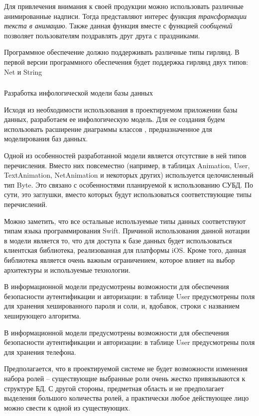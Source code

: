 Для привлечения внимания к своей продукции можно использовать различные анимированные надписи. Тогда представляют интерес функция \emph{трансформации текста в анимацию}. Также данная функция вместе с функцией \emph{сообщений} позволяет пользователям поздравлять друг друга с праздниками.

Программное обеспечение должно поддерживать различные типы гирлянд. В первой версии программного обеспечения будет поддержка гирлянд двух типов: Net и String

\subsubsection{ } Разработка инфологической модели базы данных 
\label{sec:domain:model:db}

Исходя из необходимости использования в проектируемом приложении базы данных, разработаем ее инфологическую модель. Для ее создания будем использовать расширение диаграммы классов \uml, предназначенное для моделирования баз данных.

Одной из особенностей разработанной модели является отсутствие в ней типов перечисления. Вместо них повсеместно (например, в таблицах Animation, User, TextAnimation, NetAnimation и некоторых других) используется целочисленный тип Byte. Это связано с особенностями планируемой к использованию СУБД. По сути, это заглушки, вместо которых будут использоваться соответствующие типы перечислений.

Можно заметить, что все остальные используемые типы данных соответствуют типам языка программирования Swift. Причиной использования данной нотации в модели является то, что для доступа к базе данных будет использоваться клиентская библиотека, реализованная для платформы iOS. Кроме того, данная библиотека является очень важным ограничением, которое влияет на выбор архитектуры и используемые технологии.

В информационной модели предусмотрены возможности для обеспечения безопасности аутентификации и авторизации: в таблице User предусмотрены поля для хранения хешированного пароля и соли, и, вдобавок, строки с названием хеширующего алгоритма.

В информационной модели предусмотрены возможности для обеспечения безопасности аутентификации и авторизации: в таблице User предусмотрены поля для хранения телефона.

Предполагается, что в проектируемой системе не будет возможности изменения набора ролей -- существующие выбранные роли очень жестко привязываются к структуре БД. С другой стороны, предметная область и не предполагает выделения большого количества ролей, а практически любое действующее лицо можно свести к одной из существующих.


